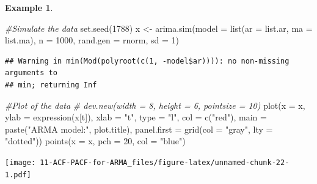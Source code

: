 \documentclass[
]{book}
\newenvironment{Shaded}{\begin{snugshade}}{\end{snugshade}}
\newcommand{\AttributeTok}[1]{\textcolor[rgb]{0.77,0.63,0.00}{#1}}
\newcommand{\CommentTok}[1]{\textcolor[rgb]{0.56,0.35,0.01}{\textit{#1}}}
\newcommand{\DecValTok}[1]{\textcolor[rgb]{0.00,0.00,0.81}{#1}}
\newcommand{\FunctionTok}[1]{\textcolor[rgb]{0.00,0.00,0.00}{#1}}
\newcommand{\NormalTok}[1]{#1}
\newcommand{\OtherTok}[1]{\textcolor[rgb]{0.56,0.35,0.01}{#1}}
\newcommand{\StringTok}[1]{\textcolor[rgb]{0.31,0.60,0.02}{#1}}
\theoremstyle{definition}
\theoremstyle{definition}
\newtheorem{example}{Example}[chapter]
\theoremstyle{definition}
\theoremstyle{definition}
\theoremstyle{remark}
\begin{document}
\begin{example}
\begin{Shaded}
\begin{Highlighting}[]
  \CommentTok{\#Simulate the data}
  \FunctionTok{set.seed}\NormalTok{(}\DecValTok{1788}\NormalTok{)}
\NormalTok{  x }\OtherTok{\textless{}{-}} \FunctionTok{arima.sim}\NormalTok{(}\AttributeTok{model =} \FunctionTok{list}\NormalTok{(}\AttributeTok{ar =}\NormalTok{ list.ar, }\AttributeTok{ma =}\NormalTok{ list.ma), }\AttributeTok{n =} \DecValTok{1000}\NormalTok{,}
    \AttributeTok{rand.gen =}\NormalTok{ rnorm, }\AttributeTok{sd =} \DecValTok{1}\NormalTok{)}
\end{Highlighting}
\end{Shaded}

\begin{verbatim}
## Warning in min(Mod(polyroot(c(1, -model$ar)))): no non-missing arguments to
## min; returning Inf
\end{verbatim}

\begin{Shaded}
\begin{Highlighting}[]
  \CommentTok{\#Plot of the data}
  \CommentTok{\# dev.new(width = 8, height = 6, pointsize = 10)}
  \FunctionTok{plot}\NormalTok{(}\AttributeTok{x =}\NormalTok{ x, }\AttributeTok{ylab =} \FunctionTok{expression}\NormalTok{(x[t]), }\AttributeTok{xlab =} \StringTok{"t"}\NormalTok{, }\AttributeTok{type =} \StringTok{"l"}\NormalTok{, }\AttributeTok{col =} \FunctionTok{c}\NormalTok{(}\StringTok{"red"}\NormalTok{),  }
    \AttributeTok{main =}  \FunctionTok{paste}\NormalTok{(}\StringTok{"ARMA model:"}\NormalTok{, plot.title),}
    \AttributeTok{panel.first =} \FunctionTok{grid}\NormalTok{(}\AttributeTok{col =} \StringTok{"gray"}\NormalTok{, }\AttributeTok{lty =} \StringTok{"dotted"}\NormalTok{))}
  \FunctionTok{points}\NormalTok{(}\AttributeTok{x =}\NormalTok{ x, }\AttributeTok{pch =} \DecValTok{20}\NormalTok{, }\AttributeTok{col =} \StringTok{"blue"}\NormalTok{)}
\end{Highlighting}
\end{Shaded}

\texttt{[image: 11-ACF-PACF-for-ARMA\_files/figure-latex/unnamed-chunk-22-1.pdf]}


\end{example}
\end{document}
